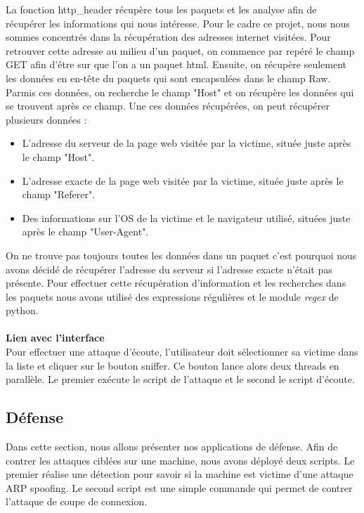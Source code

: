 \documentclass[11pt]{article}
\begin{document}
La fonction http\_header récupère tous les paquets et les analyse afin de récupérer les informations qui nous intéresse. Pour le cadre ce projet, nous nous sommes concentrés dans la récupération des adresses internet visitées. Pour retrouver cette adresse au milieu d'un paquet, on commence par repéré le champ GET afin d'être sur que l'on a un paquet html. Ensuite, on récupère seulement les données en en-tête du paquets qui sont encapsulées dans le champ Raw.  Parmis ces données, on recherche le champ "Host" et on récupère les données qui se trouvent après ce champ. 
Une ces données récupérées, on peut récupérer plusieurs données : 
\begin{itemize}
\item L'adresse du serveur de la page web visitée par la victime, située juste après le champ "Host".
\item L'adresse exacte de la page web visitée par la victime, située juste après le champ "Referer".
\item Des informations sur l'OS de la victime et le navigateur utilisé, situées juste après le champ "User-Agent".
\end{itemize}
On ne trouve pas toujours toutes les données dans un paquet c'est pourquoi nous avons décidé de récupérer l'adresse du serveur si l'adresse exacte n'était pas présente. Pour effectuer cette récupération d'information et les recherches dans les paquets nous avons utilisé des expressions régulières et le module \textit{regex} de python.
 ~\\
~\\
\textbf{Lien avec l'interface}~\\

Pour effectuer une attaque d'écoute, l'utilisateur doit sélectionner sa victime dans la liste et cliquer sur le bouton sniffer. Ce bouton lance alors deux threads en parallèle. Le premier exécute le script de l'attaque et le second le script d'écoute.

\subsection{Défense}
Dans cette section, nous allons présenter nos applications de défense.
Afin de contrer les attaques ciblées sur une machine, nous avons déployé deux scripts. Le premier réalise une détection pour savoir si la machine est victime d'une attaque ARP spoofing. Le second script est une simple commande qui permet de contrer l'attaque de coupe de connexion.
\end{document}
